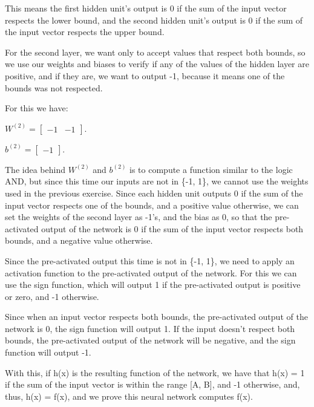 \documentclass{article}
\begin{document}
This means the first hidden unit's output is 0 if the sum of the input vector respects the lower bound, 
and the second hidden unit's output is 0 if the sum of the input vector respects the upper bound.

\bigskip

For the second layer, we want only to accept values that respect both bounds, so we use our weights and biases to verify if any of the values
of the hidden layer are positive, and if they are, we want to output -1, because it means one of the bounds was not respected.

\bigskip

For this we have:

\bigskip

\( W^{(2)} = \begin{bmatrix}
    -1 & -1
\end{bmatrix}
\).

\bigskip

\(b^{(2)} = \begin{bmatrix}
    -1
\end{bmatrix}
\).

\bigskip

The idea behind \(W^{(2)}\) and \(b^{(2)}\) is to compute a function similar to the logic AND, but since this time our inputs are not in 
\{-1, 1\}, we cannot use the weights used in the previous exercise.
Since each hidden unit outputs 0 if the sum of the input vector respects one of the bounds, and a positive value otherwise, we can set the 
weights of the second layer as -1's, and the bias as 0, so that the pre-activated output of the network is 0 if the sum of the input vector 
respects both bounds, and a negative value otherwise.

\bigskip

Since the pre-activated output this time is not in \{-1, 1\}, we need to apply an activation function to the pre-activated output of the network. 
For this we can use the sign function, which will output 1 if the pre-activated output is positive or zero, and -1 otherwise.

Since when an input vector respects both bounds, the pre-activated output of the network is 0, the sign function will output 1. If the input doesn't
respect both bounds, the pre-activated output of the network will be negative, and the sign function will output -1.

With this, if h(x) is the resulting function of the network, we have that h(x) = 1 if the sum of the input vector is within the range [A, B], 
and -1 otherwise, and, thus, h(x) = f(x), and we prove this neural network computes f(x).
\end{document}
